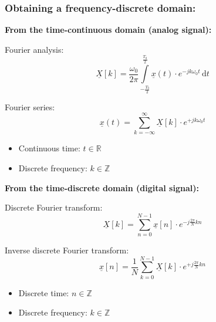 \begin{refsection}
\subsubsection{Obtaining a frequency-discrete domain:}

\begin{minipage}{0.45\linewidth}
	\textbf{From the time-continuous domain (analog signal):}
	
	\vspace{0.5em}
	
	Fourier analysis:
	\begin{equation*}
		\underline{X}[k] = \frac{\omega_0}{2 \pi} \int\limits_{-\frac{T_0}{2}}^{\frac{T_0}{2}} \underline{x}(t) \cdot e^{-j k \omega_0 t} \, \mathrm{d} t
	\end{equation*}
	
	Fourier series:
	\begin{equation*}
		\underline{x}(t) = \sum\limits_{k = -\infty}^{\infty} \underline{X}[k] \cdot e^{+ j k \omega_0 t}
	\end{equation*}
	
	\begin{itemize}
		\item Continuous time: $t \in \mathbb{R}$
		\item Discrete frequency: $k \in \mathbb{Z}$
	\end{itemize}
\end{minipage}
\hfill
\begin{minipage}{0.45\linewidth}
	\textbf{From the time-discrete domain (digital signal):}
	
	\vspace{0.5em}
	
	Discrete Fourier transform:
	\begin{equation*}
		\underline{X}[k] = \sum\limits_{n = 0}^{N - 1} \underline{x}[n] \cdot e^{- j \frac{2 \pi}{N} k n}
	\end{equation*}
	
	Inverse discrete Fourier transform:
	\begin{equation*}
		\underline{x}[n] = \frac{1}{N} \sum\limits_{k = 0}^{N - 1} \underline{X}[k]  \cdot e^{+ j \frac{2 \pi}{N} k n}
	\end{equation*}
	
	\begin{itemize}
		\item Discrete time: $n \in \mathbb{Z}$
		\item Discrete frequency: $k \in \mathbb{Z}$
	\end{itemize}
\end{minipage}


\end{refsection}
